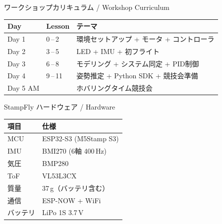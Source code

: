\documentclass[aspectratio=169, 14pt]{beamer}
\begin{document}

\begin{frame}{ワークショップカリキュラム / Workshop Curriculum}
  \begin{table}
    \centering
    \begin{tabular}{lll}
      \hline
      \textbf{Day} & \textbf{Lesson} & \textbf{テーマ} \\
      \hline
      Day 1    & 0\,--\,2   & 環境セットアップ + モータ + コントローラ \\
      Day 2    & 3\,--\,5   & LED + IMU + 初フライト \\
      Day 3    & 6\,--\,8   & モデリング + システム同定 + PID制御 \\
      Day 4    & 9\,--\,11  & 姿勢推定 + Python SDK + 競技会準備 \\
      Day 5 AM &            & ホバリングタイム競技会 \\
      \hline
    \end{tabular}
  \end{table}
\end{frame}

\begin{frame}{StampFly ハードウェア / Hardware}
  \begin{table}
    \centering
    \begin{tabular}{ll}
      \hline
      \textbf{項目} & \textbf{仕様} \\
      \hline
      MCU    & ESP32-S3 (M5Stamp S3) \\
      IMU    & BMI270 (6軸 400\,Hz) \\
      気圧   & BMP280 \\
      ToF    & VL53L3CX \\
      質量   & 37\,g（バッテリ含む） \\
      通信   & ESP-NOW + WiFi \\
      バッテリ & LiPo 1S 3.7\,V \\
      \hline
    \end{tabular}
  \end{table}
\end{frame}
\end{document}

